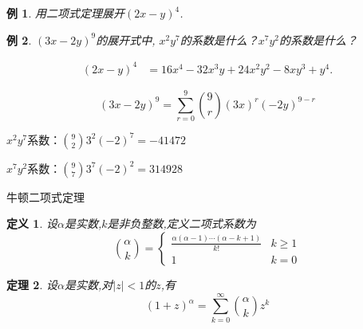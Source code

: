 \documentclass[punct]{ctexbeamer}
\newtheorem{thm}{定理}[section]
\newtheorem{defi}[thm]{定义}
\newtheorem{ex}{例}[section]
\begin{document}
\begin{frame}
    \begin{ex}
        用二项式定理展开$(2x-y)^{4}$.
    \end{ex}

    \begin{ex}
        $(3x-2y)^{9}$的展开式中,  $x^{2}y^{7}$的系数是什么？$x^{7}y^{2}$的系数是什么？
    \end{ex}


    \pause
    \[\begin{aligned}
        (2x-y)^{4}&=16 x^4-32 x^3 y+24 x^2 y^2-8 x y^3+y^4.
    \end{aligned}
    \]


    \[
    (3x-2y)^{9}=\sum_{r=0}^{9}\binom{9}{r}(3x)^{r}(-2y)^{9-r}
    \]

\begin{center}
$x^{2}y^{7}$系数：$\binom{9}{2}3^{2}(-2)^{7} = -41472$

$x^{7}y^{2}$系数：$\binom{9}{7}3^{7}(-2)^{2} = 314928$
\end{center}

\end{frame}









\begin{frame}{牛顿二项式定理}
	\begin{defi}
    设$\alpha$是实数,$k$是非负整数,定义二项式系数为\vspace*{8pt}
    $$
    \binom{\alpha}{k}=\left\{\begin{array}{cc}
        \frac{\alpha({\alpha}-1) \cdots(\alpha-{k}+{1})}{{k} !} & {k} \geq {1}
       \\[6pt]
        {1} & {k}={0}
    \end{array}\right.
    $$
\end{defi}

	\begin{thm}
	设$\alpha$是实数,对$|z|< 1$的$z$,有
		$$(1+z)^{\alpha}=\sum _{k=0}^\infty \binom{\alpha}{k} z^k$$
	\end{thm}

\end{frame}
\end{document}
